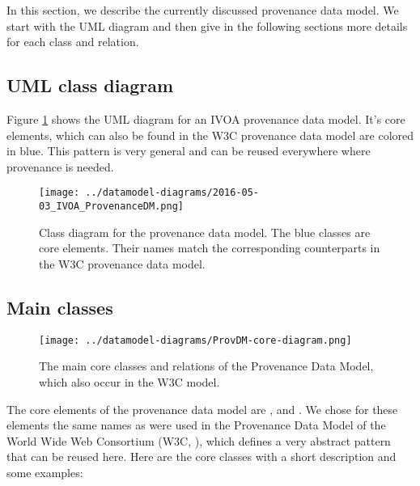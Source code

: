 In this section, we describe the currently discussed provenance data model. We 
start with the UML diagram and then give in the following sections more details 
for each class and relation.

\subsection{UML class diagram}
Figure \ref{fig:classdiagram} shows the UML diagram for an IVOA provenance data
model. It's core elements, which can also be found in the W3C provenance data
model are colored in blue. This pattern is very general and can be reused everywhere 
where provenance is needed. 

\begin{figure}[h]
\centering
\texttt{[image: ../datamodel-diagrams/2016-05-03\_IVOA\_ProvenanceDM.png]}
\caption{Class diagram for the provenance data model. The blue classes are core 
elements. Their names match the corresponding counterparts in the W3C provenance 
data model.}
\label{fig:classdiagram}
\end{figure}



\subsection{Main classes}\label{sec:core}

\begin{figure}[h]
\centering
\texttt{[image: ../datamodel-diagrams/ProvDM-core-diagram.png]}
\caption{The main core classes and relations of the Provenance Data Model, which also occur in the W3C model.}
\label{fig:coreclasses}
\end{figure}


The core elements of the provenance data model are ,  and . 
We chose for these elements the same names as were used in the Provenance Data 
Model of the World Wide Web Consortium (W3C, \cite{std:W3CProvDM}), which defines 
a very abstract pattern that can be reused here. Here are the core classes with 
a short description and some examples:

